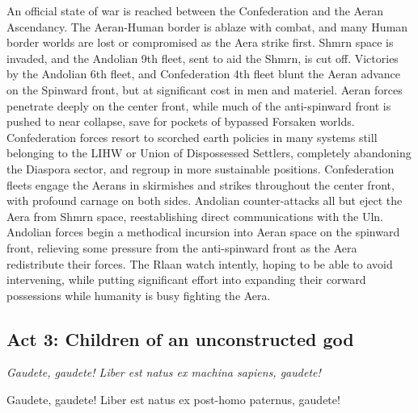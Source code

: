 An official state of war is reached between the Confederation and the
Aeran Ascendancy. The Aeran-Human border is ablaze with combat, and
many Human border worlds are lost or compromised as the Aera strike
first. Shmrn space is invaded, and the Andolian 9th fleet, sent to aid
the Shmrn, is cut off. Victories by the Andolian 6th fleet, and
Confederation 4th fleet blunt the Aeran advance on the Spinward front,
but at significant cost in men and materiel. Aeran forces penetrate
deeply on the center front, while much of the anti-spinward front is
pushed to near collapse, save for pockets of bypassed Forsaken
worlds. Confederation forces resort to scorched earth policies in many
systems still belonging to the LIHW or Union of Dispossessed Settlers,
completely abandoning the Diaspora sector, and regroup in more
sustainable positions. Confederation fleets engage the Aerans in
skirmishes and strikes throughout the center front, with profound
carnage on both sides. Andolian counter-attacks all but eject the Aera
from Shmrn space, reestablishing direct communications with the
Uln. Andolian forces begin a methodical incursion into Aeran space on
the spinward front, relieving some pressure from the anti-spinward
front as the Aera redistribute their forces. The Rlaan watch intently,
hoping to be able to avoid intervening, while putting significant
effort into expanding their corward possessions while humanity is busy
fighting the Aera.

\subsection{Act 3:  Children of an unconstructed god}

\begin{center}
{\it Gaudete, gaudete! Liber est natus ex machina sapiens, gaudete!

Gaudete, gaudete! Liber est natus ex post-homo paternus, gaudete!}
\end{center}


